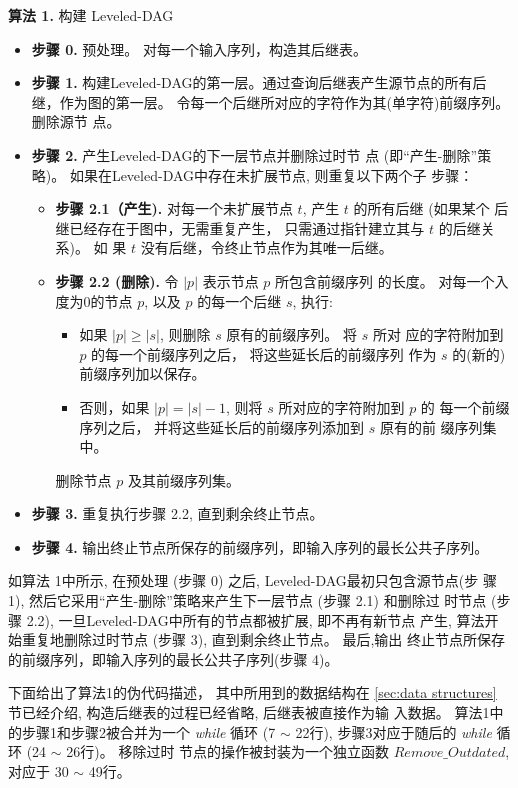 \textbf{算法 1.} 构建 Leveled-DAG
\begin{itemize}
\item \textbf{步骤 0.} 预处理。 对每一个输入序列，构造其后继表。
\item \textbf{步骤 1.} 构建Leveled-DAG的第一层。通过查询后继表产生源节点的所有后
  继，作为图的第一层。 令每一个后继所对应的字符作为其(单字符)前缀序列。删除源节
  点。
\item \textbf{步骤 2.} 产生Leveled-DAG的下一层节点并删除过时节
  点 (即“产生-删除”策略)。 如果在Leveled-DAG中存在未扩展节点, 则重复以下两个子
  步骤：
  \begin{itemize}
  \item \textbf{步骤 2.1（产生).} 对每一个未扩展节点 $t$, 产生 $t$ 的所有后继 (如果某个
    后继已经存在于图中，无需重复产生， 只需通过指针建立其与 $t$ 的后继关系)。 如
    果 $t$ 没有后继，令终止节点作为其唯一后继。
  \item \textbf{步骤 2.2 (删除).} 令 $|p|$ 表示节点 $p$ 所包含前缀序列
    的长度。 对每一个入度为0的节点 $p$, 以及 $p$ 的每一个后继 $s$, 执行:
    \begin{itemize}
    \item 如果 $|p| \geq |s|$, 则删除 $s$ 原有的前缀序列。 将 $s$ 所对
      应的字符附加到 $p$ 的每一个前缀序列之后， 将这些延长后的前缀序列
      作为 $s$ 的(新的)前缀序列加以保存。
    \item 否则，如果 $|p| = |s|-1$, 则将 $s$ 所对应的字符附加到 $p$ 的
      每一个前缀序列之后， 并将这些延长后的前缀序列添加到 $s$ 原有的前
      缀序列集中。
    \end{itemize}
    删除节点 $p$ 及其前缀序列集。
  \end{itemize}
\item \textbf{步骤 3.} 重复执行步骤 2.2, 直到剩余终止节点。
\item \textbf{步骤 4.} 输出终止节点所保存的前缀序列，即输入序列的最长公共子序列。
\end{itemize}

如算法 1中所示, 在预处理 (步骤 0) 之后, Leveled-DAG最初只包含源节点(步
骤 1), 然后它采用“产生-删除”策略来产生下一层节点 (步骤 2.1) 和删除过
时节点 (步骤 2.2), 一旦Leveled-DAG中所有的节点都被扩展, 即不再有新节点
产生, 算法开始重复地删除过时节点 (步骤 3), 直到剩余终止节点。 最后,输出
终止节点所保存的前缀序列，即输入序列的最长公共子序列(步骤 4)。

下面给出了算法1的伪代码描述， 其中所用到的数据结构在 \ref{sec:data
  structures} 节已经介绍, 构造后继表的过程已经省略, 后继表被直接作为输
入数据。 算法1中的步骤1和步骤2被合并为一个 \emph{while} 循环 (7 $\sim$
22行), 步骤3对应于随后的 \emph{while} 循环 (24 $\sim$ 26行)。 移除过时
节点的操作被封装为一个独立函数 $Remove\_Outdated$, 对应于 30 $\sim$
49行。

